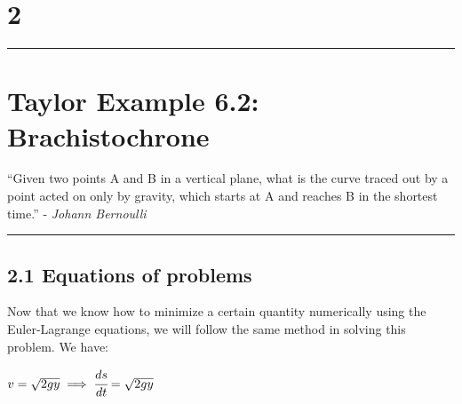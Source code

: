 \documentclass[hidelinks, 11pt]{article}
\begin{document}
\begin{center}
  \section*{2}
  \noindent\rule{16cm}{0.4pt}
  \section*{Taylor Example 6.2: Brachistochrone} 
  \begin{changemargin}{3.7cm}{3.7cm}
    ``Given two points A and B in a vertical plane, what is the curve traced out by a point acted on only by gravity, which starts at A and reaches B in the shortest time.'' - \emph{Johann Bernoulli}
  \end{changemargin}
  \noindent\rule{16cm}{0.4pt}
\end{center}

\subsection*{2.1 Equations of problems}

\begin{center}
\end{center}

Now that we know how to minimize a certain quantity numerically using the Euler-Lagrange equations, we will follow the same method in solving this problem. We have:

\begin{center}
$v = \sqrt{2gy} \implies \cfrac{ds}{dt} = \sqrt{2gy}$
\end{center}
\end{document}
